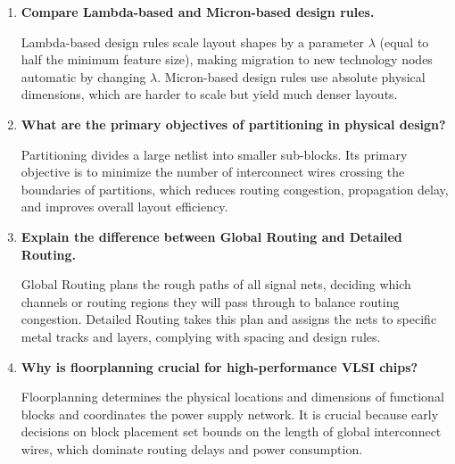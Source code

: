 \documentclass[12pt,a4paper]{article}
\newcommand{\Q}[1]{\textbf{#1}\par\noindent\ignorespaces}
\begin{document}
\begin{tcolorbox}[exambox, title={\textbf{Frequently Asked / Viva Questions}}]
\begin{enumerate}[topsep=0pt, label=\textbf{Q\arabic*.}, itemsep=5pt]
    Stick diagrams use: Blue for Metal 1 (routing and rails), Red for Polysilicon (gate contacts), Green for n-diffusion (nMOS active channel), Amber/Yellow for p-diffusion (pMOS active channel), and black dots/crosses for layer connection contacts.
  \item \Q{Compare Lambda-based and Micron-based design rules.}
    Lambda-based design rules scale layout shapes by a parameter $\lambda$ (equal to half the minimum feature size), making migration to new technology nodes automatic by changing $\lambda$. Micron-based design rules use absolute physical dimensions, which are harder to scale but yield much denser layouts.
  \item \Q{What are the primary objectives of partitioning in physical design?}
    Partitioning divides a large netlist into smaller sub-blocks. Its primary objective is to minimize the number of interconnect wires crossing the boundaries of partitions, which reduces routing congestion, propagation delay, and improves overall layout efficiency.
  \item \Q{Explain the difference between Global Routing and Detailed Routing.}
    Global Routing plans the rough paths of all signal nets, deciding which channels or routing regions they will pass through to balance routing congestion. Detailed Routing takes this plan and assigns the nets to specific metal tracks and layers, complying with spacing and design rules.
  \item \Q{Why is floorplanning crucial for high-performance VLSI chips?}
    Floorplanning determines the physical locations and dimensions of functional blocks and coordinates the power supply network. It is crucial because early decisions on block placement set bounds on the length of global interconnect wires, which dominate routing delays and power consumption.
\end{enumerate}
\end{tcolorbox}
\end{document}
